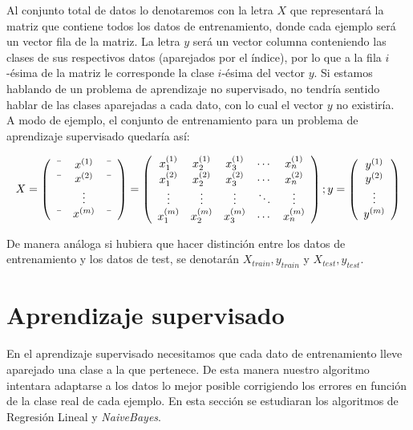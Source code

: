 Al conjunto total de datos lo denotaremos con la letra $X$ que representará la matriz que contiene
todos los datos de entrenamiento, donde cada ejemplo será un vector fila de la matriz.
La letra $y$ será un vector columna conteniendo las clases de sus respectivos datos (aparejados por el índice), 
por lo que a la fila $i$-ésima de la matriz le corresponde la clase $i$-ésima del vector $y$.
Si estamos hablando de un problema de aprendizaje no supervisado, no tendría sentido hablar de las clases 
aparejadas a cada dato, con lo cual el vector $y$ no existiría.\\
A modo de ejemplo, el conjunto de entrenamiento para un problema de aprendizaje supervisado quedaría así:

$$
X = \left(\begin{array}{ccc}
    \textemdash & x^{(1)} & \textemdash \\
    \textemdash & x^{(2)} & \textemdash \\
     & \vdots &  \\
    \textemdash & x^{(m)} & \textemdash \\
\end{array}\right)
%
=
  \left(\begin{array}{ccccc}
    x^{(1)}_1 & x^{(1)}_2 & x^{(1)}_3 & \cdots & x^{(1)}_n \\
    x^{(2)}_1 & x^{(2)}_2 & x^{(2)}_3 & \cdots & x^{(2)}_n \\
    \vdots & \vdots & \vdots & \ddots & \vdots \\
    x^{(m)}_1 & x^{(m)}_2 & x^{(m)}_3 & \cdots & x^{(m)}_n \\
\end{array}\right)
%
;
y = \left(\begin{array}{c}
    y^{(1)} \\
    y^{(2)} \\
    \vdots \\
    y^{(m)} \\
\end{array}\right)
$$

De manera análoga si hubiera que hacer distinción entre los datos de entrenamiento y los datos de test, 
se denotarán $X_{train}, y_{train}$ y $X_{test}, y_{test}$.


\section{Aprendizaje supervisado}
En el aprendizaje supervisado necesitamos que cada dato de entrenamiento lleve aparejado una clase 
a la que pertenece. De esta manera nuestro algoritmo intentara adaptarse a los datos lo mejor 
posible corrigiendo los errores en función de la clase real de cada ejemplo.
En esta sección se estudiaran los algoritmos de Regresión Lineal y \textit{NaiveBayes}.


